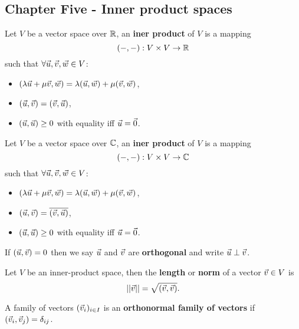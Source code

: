 \newpage
\begin{multicols}{2}
\section*{Chapter Five - Inner product spaces}

\begin{definition}
Let $V$ be a vector space over $\mathbb{R}$, an \textbf{iner product} of $V$ is a mapping
    \[
    (-,-):V\times V\to\mathbb{R}
    \]
such that $\forall\vec{u},\vec{v},\vec{w}\in V$:
    \begin{itemize}
        \item $(\lambda\vec{u}+\mu\vec{v},\vec{w}) = \lambda(\vec{u},\vec{w})+\mu(\vec{v},\vec{w})$,
        \item $(\vec{u},\vec{v})=(\vec{v},\vec{u})$,
        \item $(\vec{u},\vec{u})\geq0$ with equality iff $\vec{u}=\vec{0}$.
    \end{itemize}
\end{definition}

\begin{definition}
Let $V$ be a vector space over $\mathbb{C}$, an \textbf{iner product} of $V$ is a mapping
    \[
    (-,-):V\times V\to\mathbb{C}
    \]
such that $\forall\vec{u},\vec{v},\vec{w}\in V$:
    \begin{itemize}
        \item $(\lambda\vec{u}+\mu\vec{v},\vec{w}) = \lambda(\vec{u},\vec{w})+\mu(\vec{v},\vec{w})$,
        \item $(\vec{u},\vec{v})=\overline{(\vec{v},\vec{u})}$,
        \item $(\vec{u},\vec{u})\geq0$ with equality iff $\vec{u}=\vec{0}$.
    \end{itemize}
\end{definition}

\begin{definition}
If $(\vec{u},\vec{v})=0$ then we say $\vec{u}$ and $\vec{v}$ are \textbf{orthogonal} and write $\vec{u}\perp\vec{v}$.
\end{definition}

\begin{definition}
Let $V$ be an inner-product space, then the \textbf{length} or \textbf{norm} of a vector $\vec{v}\in V$ is
    \[
    ||\vec{v}|| = \sqrt{(\vec{v},\vec{v})}.
    \]
\end{definition}

\begin{definition}
A family of vectors $(\vec{v}_i)_{i\in I}$ is an \textbf{orthonormal family of vectors} if $(\vec{v}_i,\vec{v}_j)=\delta_{ij}$.
\end{definition}


\end{multicols}
